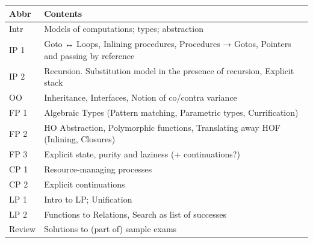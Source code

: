 \documentclass[oneside,11pt]{article}
\begin{document}
\begin{center}
\begin{tabular}{ll}
Abbr & Contents\\
\hline
Intr & Models of computations; types; abstraction\\
IP 1 & Goto ↔ Loops, Inlining procedures, Procedures → Gotos, Pointers and passing by reference\\
IP 2 & Recursion. Substitution model in the presence of recursion, Explicit stack\\
OO & Inheritance, Interfaces, Notion of co/contra variance\\
FP 1 & Algebraic Types (Pattern matching, Parametric types, Currification)\\
FP 2 & HO Abstraction, Polymorphic functions, Translating away HOF (Inlining, Closures)\\
FP 3 & Explicit state, purity and laziness (+ continuations?)\\
CP 1 & Resource-managing processes\\
CP 2 & Explicit continuations\\
LP 1 & Intro to LP; Unification\\
LP 2 & Functions to Relations, Search as list of successes\\
Review & Solutions to (part of) sample exams\\
\end{tabular}
\end{center}

\end{document}
